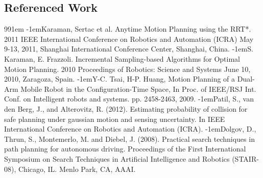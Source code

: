 \documentclass[12pt]{article}
\begin{document}
\subsection*{Referenced Work}

\def\bibindent{1em}
\begin{thebibliography}{99\kern\bibindent}
\makeatletter
\let\old@biblabel\@biblabel
\def\@biblabel#1{\old@biblabel{#1}\kern\bibindent}
\let\old@bibitem\bibitem
\def\bibitem#1{\old@bibitem{#1}\leavevmode\kern-\bibindent}
\makeatother
            Karaman, Sertac et al. Anytime Motion Planning using the RRT*. 2011 IEEE International Conference on Robotics and Automation (ICRA) May 9-13, 2011, Shanghai International Conference Center, Shanghai, China.
            S. Karaman, E. Frazzoli. Incremental Sampling-based Algorithms for Optimal Motion Planning. 2010 Proceedings of Robotics: Science and Systems June 10, 2010, Zaragoza, Spain.
            Y-C. Tsai, H-P. Huang, Motion Planning of a Dual-Arm Mobile Robot in the Configuration-Time Space, In Proc. of IEEE/RSJ Int. Conf. on Intelligent robots and systems. pp. 2458-2463, 2009. 
            Patil, S., van den Berg, J., and Alterovitz, R. (2012). Estimating probability of collision for safe planning under gaussian motion and sensing uncertainty. In IEEE International Conference on Robotics and Automation (ICRA).
            Dolgov, D., Thrun, S., Montemerlo, M. and Diebel, J. (2008). Practical search techniques in path planning for autonomous driving. Proceedings of the First International Symposium on Search Techniques in Artificial Intelligence and Robotics (STAIR-08), Chicago, IL. Menlo Park, CA, AAAI.

\end{thebibliography}
\end{document}
